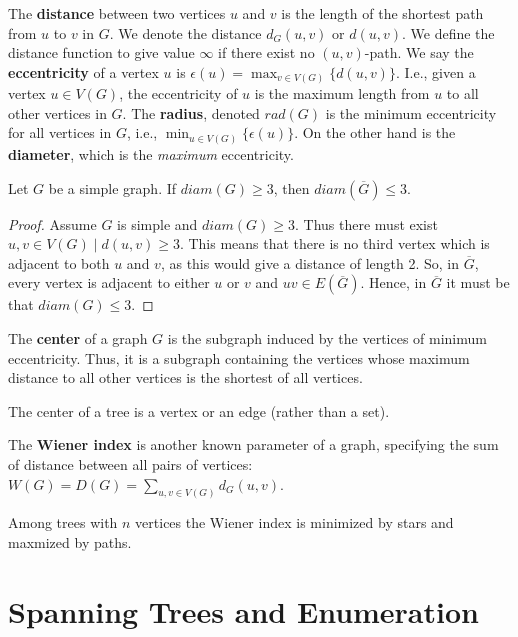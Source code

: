 The \textbf{distance} between two vertices $u$ and $v$ is the length of the shortest path from $u$ to $v$ in $G$. We denote the distance $d_{G}(u,v)$ or $d(u,v)$. We define the distance function to give value $\infty$ if there exist no $(u,v)$-path. We say the \textbf{eccentricity} of a vertex $u$ is $\epsilon(u) = \max_{v \in V(G)}\{d(u,v)\}$. I.e., given a vertex $u \in V(G)$, the eccentricity of $u$ is the maximum length from $u$ to all other vertices in $G$. The \textbf{radius}, denoted $rad(G)$ is the minimum eccentricity for all vertices in $G$, i.e., $\min_{u \in V(G)} \{\epsilon(u)\}$. On the other hand is the \textbf{diameter}, which is the \textit{maximum} eccentricity.

\begin{theorem}
	Let $G$ be a simple graph. If $diam(G)\ge 3$, then $diam(\overline{G}) \le 3$.
\end{theorem}

\begin{proof}
	Assume $G$ is simple and $diam(G) \ge 3$. Thus there must exist $u,v \in V(G) \mid d(u,v) \ge 3$. This means that there is no third vertex which is adjacent to both $u$ and $v$, as this would give a distance of length 2. So, in $\overline{G}$, every vertex is adjacent to either $u$ or $v$ and $uv \in E(\overline{G})$. Hence, in $\overline{G}$ it must be that $diam(G) \le 3$.
\end{proof}

The \textbf{center} of a graph $G$ is the subgraph induced by the vertices of minimum eccentricity. Thus, it is a subgraph containing the vertices whose maximum distance to all other vertices is the shortest of all vertices.

\begin{theorem}
	The center of a tree is a vertex or an edge (rather than a set).
\end{theorem}

The \textbf{Wiener index} is another known parameter of a graph, specifying the sum of distance between all pairs of vertices: $W(G) = D(G) = \sum_{u, v\in V(G)} d_{G}(u,v)$.

\begin{theorem}
	Among trees with $n$ vertices the Wiener index is minimized by stars and maxmized by paths.
\end{theorem}

\section{Spanning Trees and Enumeration}%
\label{sec:label}

